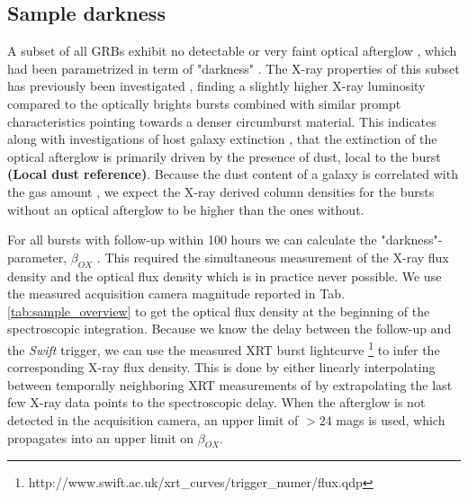 \documentclass{aa}    %
\newcommand\todo[1]{\textbf{(#1)}}
\begin{document}
\subsection{Sample darkness} \label{darkness}

A subset of all GRBs exhibit no detectable or very faint optical afterglow
\citep{Groot1998, Djorgovski2001, Fynbo2001}, which had been parametrized in
term of "darkness" \citep{Jakobsson2004, VanderHorst2009}. The X-ray properties
of this subset has previously been investigated \citep{DePasquale2003, Fynbo2009,
	Melandri2012}, finding a slightly higher X-ray luminosity compared to the
optically brights bursts combined with similar prompt characteristics pointing
towards a denser circumburst material. This indicates along with investigations
of host galaxy extinction \citep{Greiner2011, Kruhler2011, Hjorth2012}, that the
extinction of the optical afterglow is primarily driven by the presence of dust,
local to the burst \todo{Local dust reference}. Because the dust content of a
galaxy is correlated with the gas amount \citep{Bohlin1978, Guver2009}, we
expect the X-ray derived column densities for the bursts without an optical
afterglow to be higher than the ones without.

For all bursts with follow-up within 100 hours we can calculate the
"darkness"-parameter, $\beta_{OX}$ \citep{Jakobsson2004, Milvang-Jensen2012}. This required the
simultaneous measurement of the X-ray flux density and the optical flux density
which is in practice never possible. We use the measured acquisition camera
magnitude reported in Tab. \ref{tab:sample_overview} to get the optical flux
density at the beginning of the spectroscopic integration. Because we know the
delay between the follow-up and the \textit{Swift} trigger, we can use the
measured XRT burst lightcurve \citep{Evans2007,
	Evans2009}\footnote{http://www.swift.ac.uk/xrt\_curves/trigger\_numer/flux.qdp}
to infer the corresponding X-ray flux density. This is done by either linearly
interpolating between temporally neighboring XRT measurements of by
extrapolating the last few X-ray data points to the spectroscopic delay. When
the afterglow is not detected in the acquisition camera, an upper limit of $> 24$
mags is used, which propagates into an upper limit on $\beta_{OX}$.
\end{document}
